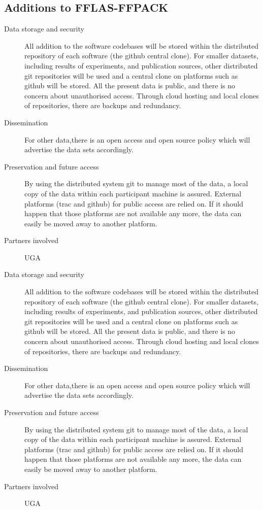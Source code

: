 \documentclass{deliverablereport}
\begin{document}
\begin{enumerate}
\subsection{Additions to FFLAS-FFPACK}

\begin{description}
\item[Data storage and security] All addition to the software codebases will be stored within the distributed repository of each software (the github central clone). For smaller datasets, including results of experiments, and publication sources, other distributed git repositories will be used and a central clone on platforms such as github will be stored. All the present data is public, and there is no concern about unauthorised access. Through cloud hosting and local clones of repositories, there are backups and redundancy.
\item[Dissemination] For other data,there is an open access and open source policy which will advertise the data sets accordingly.
\item[Preservation and future access] By using the distributed system git to manage most of the data, a local copy of the data within each participant machine is assured. External platforms (trac and github) for public access are relied on. If it should happen that those platforms are not available any more, the data can easily be moved away to another platform.
\item[Partners involved] UGA
\end{description}

\begin{description}
\item[Data storage and security] All addition to the software codebases will be stored within the distributed repository of each software (the github central clone). For smaller datasets, including results of experiments, and publication sources, other distributed git repositories will be used and a central clone on platforms such as github will be stored. All the present data is public, and there is no concern about unauthorised access. Through cloud hosting and local clones of repositories, there are backups and redundancy.
\item[Dissemination] For other data,there is an open access and open source policy which will advertise the data sets accordingly.
\item[Preservation and future access] By using the distributed system git to manage most of the data, a local copy of the data within each participant machine is assured. External platforms (trac and github) for public access are relied on. If it should happen that those platforms are not available any more, the data can easily be moved away to another platform.
\item[Partners involved] UGA
\end{description}
\end{enumerate}
\end{document}
